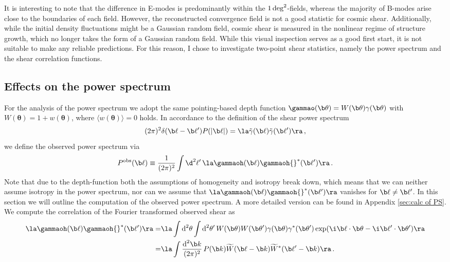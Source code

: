 It is interesting to note that the difference in E-modes is predominantly within the $1\,\rm{deg}^2$-fields, whereas the majority of B-modes arise close to the boundaries of each field. However, the reconstructed convergence field is not a good statistic for cosmic shear. Additionally, while the initial density fluctuations might be a Gaussian random field, cosmic shear is measured in the nonlinear regime of structure growth, which no longer takes the form of a Gaussian random field. While this visual inspection serves as a good first start, it is not suitable to make any reliable predictions. For this reason, I chose to investigate two-point shear statistics, namely the power spectrum and the shear correlation functions.
\subsection{Effects on the power spectrum}
\label{sec:model_ps}
For the analysis of the power spectrum we adopt the same pointing-based depth function \linebreak$\gammao(\b\theta)=W(\b \theta)\gamma(\b\theta)$ with $W(\bm{\theta}) = 1+w(\bm{\theta})$, where $\langle w(\bm{\theta})\rangle=0$ holds. 
In accordance to the definition of the shear power spectrum \begin{equation}
(2\pi)^2\delta(\b\ell-\b\ell')P(|\b\ell|) = \la \tilde{\gamma}(\b\ell)\tilde{\gamma}(\b\ell')\ra \, ,
\end{equation}
we define the observed power spectrum via \begin{equation}
P^{\text{obs}}(\b\ell) \equiv \frac{1}{(2\pi)^2}\int \d^2 \ell'\,  \la \gammaoh(\b \ell) \gammaoh {}^*(\b \ell')\ra \, .
\end{equation}
Note that due to the depth-function both the assumptions of homogeneity and isotropy break down, which means that we can neither assume isotropy in the power spectrum, nor can we assume that $\la \gammaoh(\b \ell) \gammaoh {}^*(\b \ell')\ra$ vanishes for $\b\ell\neq\b\ell'$. In this section we will outline the computation of the observed power spectrum. A more detailed version can be found in Appendix \ref{sec:calc of PS}. We compute the correlation of the Fourier transformed observed shear as \begin{align*}
\la \gammaoh(\b \ell) \gammaoh {}^*(\b \ell')\ra = & \la\int\text{d}^2 \theta\int\text{d}^2 \theta'\,W(\b \theta)W(\b \theta')\gamma(\b \theta)\gamma^*(\b \theta')\exp(\i\b \ell\cdot\b \theta-\i\b \ell'\cdot\b \theta')\ra \nonumber \\
  = & \la \int\frac{\text{d}^2 \b k}{(2\pi)^2} \, P(\b k)\widetilde{W}(\b \ell-\b k)\widetilde{W}^* (\b \ell'-\b k)\ra \, .
\end{align*}

